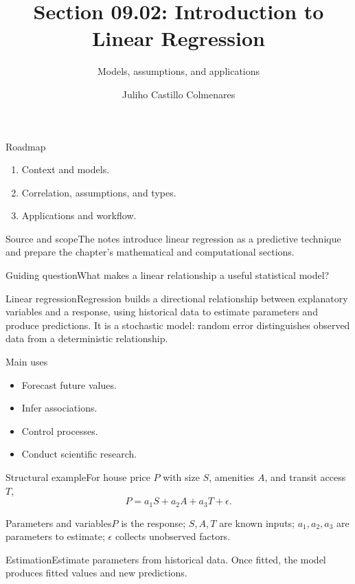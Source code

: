 \documentclass[10pt,aspectratio=169]{beamer}
\title[Introduction to linear regression]{Section 09.02: Introduction to Linear Regression}\subtitle{Models, assumptions, and applications}\author[J. Castillo Colmenares]{Juliho Castillo Colmenares}\institute{Tecnológico de Monterrey}\date{}
\begin{document}
\begin{frame}[plain]\titlepage\end{frame}
\begin{frame}{Roadmap}\small\begin{enumerate}\item Context and models.\item Correlation, assumptions, and types.\item Applications and workflow.\end{enumerate}\end{frame}
\begin{frame}{Source and scope}\small The notes introduce linear regression as a predictive technique and prepare the chapter's mathematical and computational sections.\begin{block}{Guiding question}What makes a linear relationship a useful statistical model?\end{block}\end{frame}
\begin{frame}{Linear regression}\small Regression builds a directional relationship between explanatory variables and a response, using historical data to estimate parameters and produce predictions. It is a stochastic model: random error distinguishes observed data from a deterministic relationship.\end{frame}
\begin{frame}{Main uses}\small\begin{itemize}\item Forecast future values.\item Infer associations.\item Control processes.\item Conduct scientific research.\end{itemize}\end{frame}
\begin{frame}{Structural example}\small For house price $P$ with size $S$, amenities $A$, and transit access $T$,\[P=a_1S+a_2A+a_3T+\epsilon.\]\end{frame}
\begin{frame}{Parameters and variables}\small $P$ is the response; $S,A,T$ are known inputs; $a_1,a_2,a_3$ are parameters to estimate; $\epsilon$ collects unobserved factors.\end{frame}
\begin{frame}{Estimation}\small Estimate parameters from historical data. Once fitted, the model produces fitted values and new predictions.\end{frame}
\end{document}
